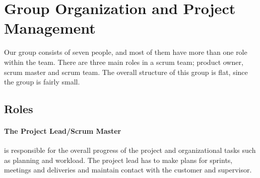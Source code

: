\section{Group Organization and Project Management}
\label{sec:IntroGroupOrg}
Our group consists of seven people, and most of them have more than one role within the team. There are three main roles in a scrum team; product owner, scrum master and scrum team. The overall structure of this group is flat, since the group is fairly small.

\subsection{Roles}
\label{subsec:IntroGroupOrgRoles}
\paragraph{The Project Lead/Scrum Master} is responsible for the overall progress of the project and organizational tasks such as planning and workload. The project lead has to make plans for sprints, meetings and deliveries and maintain contact with the customer and supervisor.

